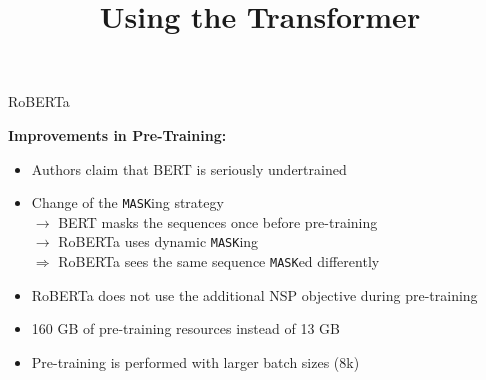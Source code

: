



\newcommand{\titlefigure}{figure/sesamestreet.jpeg}
\newcommand{\learninggoals}{
\item Understand the improvements over BERT
\item Dynamic Masking}

\title{Using the Transformer}
\date{}




\begin{frame}{RoBERTa}

\vspace{1cm}

	\textbf{Improvements in Pre-Training:}

	\begin{itemize}
		\item Authors claim that BERT is seriously undertrained
		\item Change of the \texttt{MASK}ing strategy  \\
					$\rightarrow$ BERT masks the sequences once before pre-training  \\
					$\rightarrow$ RoBERTa uses dynamic \texttt{MASK}ing  \\
					$\Rightarrow$ RoBERTa sees the same sequence \texttt{MASK}ed differently
		\item RoBERTa does not use the additional NSP objective during pre-training
		\item 160 GB of pre-training resources instead of 13 GB
		\item Pre-training is performed with larger batch sizes (8k)
	\end{itemize}
\end{frame}



